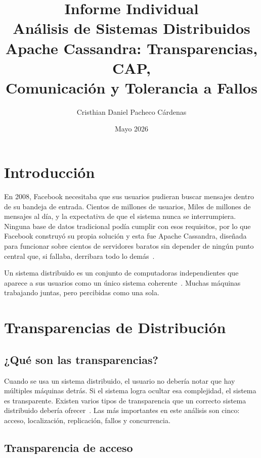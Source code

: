 \documentclass[12pt, a4paper]{article}
\title{
  \vspace{8cm}
  \large \textbf{Informe Individual} \\[0.5em]
  \Large \textbf{Análisis de Sistemas Distribuidos} \\[0.5em]
  \large Apache Cassandra: Transparencias, CAP,\\
  Comunicación y Tolerancia a Fallos
}
\author{Cristhian Daniel Pacheco Cárdenas}
\date{Mayo 2026}
\begin{document}
\maketitle
\thispagestyle{empty}
\newpage

\tableofcontents
\newpage

\section{Introducción}

En 2008, Facebook necesitaba que sus usuarios pudieran buscar mensajes
dentro de su bandeja de entrada. Cientos de millones
de usuarios, Miles de millones de mensajes al día, y la expectativa de
que el sistema nunca se interrumpiera. Ninguna base de datos tradicional
podía cumplir con esos requisitos, por lo que Facebook construyó su propia
solución y esta fue Apache Cassandra, diseñada para funcionar sobre cientos de
servidores baratos sin depender de ningún punto central que, si fallaba, derribara todo lo demás~\cite{lakshman2010}.

Un sistema distribuido es un conjunto
de computadoras independientes que aparece a sus usuarios como un único sistema coherente~\cite{tanenbaum2007}. Muchas máquinas trabajando
juntas, pero percibidas como una sola.

\section{Transparencias de Distribución}

\subsection{¿Qué son las transparencias?}

Cuando se usa un sistema distribuido, el usuario no debería notar que hay múltiples máquinas detrás. Si el sistema logra ocultar esa complejidad, el sistema es transparente. Existen varios tipos de transparencia que un correcto sistema distribuido debería ofrecer~\cite{tanenbaum2007}. Las más importantes en este análisis son cinco: acceso, localización, replicación, fallos y concurrencia.

\subsection{Transparencia de acceso}
\end{document}
